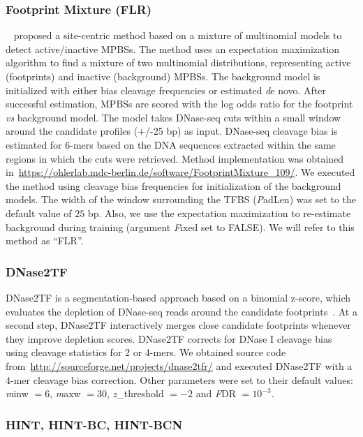 \documentclass[11pt]{article}
\begin{document}
\subsubsection{Footprint Mixture (FLR)}
\label{sec:flr}

~\cite{yardimci2014} proposed a site-centric method based on a mixture of multinomial models to detect active/inactive MPBSs. The method uses an expectation maximization algorithm to find a mixture of two multinomial distributions, representing active (footprints) and inactive (background) MPBSs. The background model is initialized with either bias cleavage frequencies or estimated {\emph de novo}. After successful estimation, MPBSs are scored with the log odds ratio for the footprint \emph{vs} background model. The model takes DNase-seq cuts within a small window around the candidate profiles (+/-25 bp) as input. DNase-seq cleavage bias is estimated for 6-mers based on the DNA sequences extracted within the same regions in which the cuts were retrieved. Method implementation was obtained in~\url{https://ohlerlab.mdc-berlin.de/software/FootprintMixture_109/}. We executed the method using cleavage bias frequencies for initialization of the background models. The width of the window surrounding the TFBS ({\emph PadLen}) was set to the default value of $25$ bp. Also, we use the expectation maximization to re-estimate background during training (argument {\emph Fixed} set to FALSE). We will refer to this method as ``FLR''.

\subsubsection{DNase2TF}
\label{sec:dnase2tf}

DNase2TF is a segmentation-based approach based on a binomial z-score, which evaluates the depletion of DNase-seq reads around the candidate footprints~\citep{sung2014}. At a second step, DNase2TF interactively merges close candidate footprints whenever they improve depletion scores. DNase2TF corrects for DNase I cleavage bias using cleavage statistics for 2 or 4-mers. We obtained source code from~\url{http://sourceforge.net/projects/dnase2tfr/} and executed DNase2TF with a 4-mer cleavage bias correction. Other parameters were set to their default values: {\emph minw} $= 6$, {\emph maxw} $= 30$, {\emph z\_threshold} $= -2$ and {\emph FDR} $= 10^{-3}$.


\subsubsection{HINT, HINT-BC, HINT-BCN}
\label{sec:hint}
\end{document}
